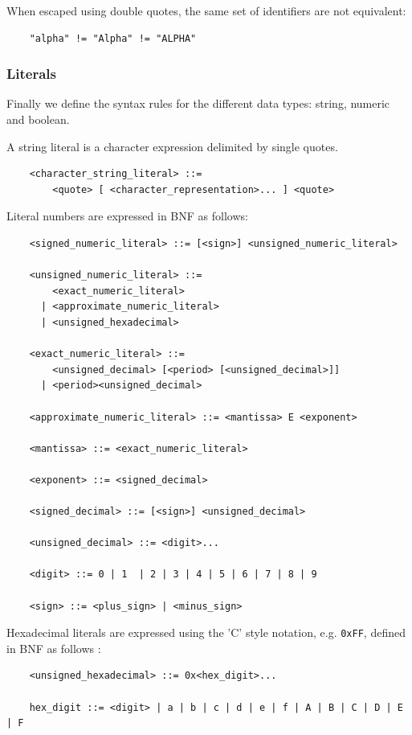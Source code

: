 \documentclass[11pt,a4paper]{ivoa}
\begin{document}
When escaped using double quotes, the same set of identifiers are not equivalent:
\begin{verbatim}
    "alpha" != "Alpha" != "ALPHA"
\end{verbatim}

\subsubsection{Literals}
\label{sec:literals}

Finally we define the syntax rules for the different data types: string,
numeric and boolean.

A string literal is a character expression delimited by single quotes.

\begin{verbatim}
    <character_string_literal> ::=
        <quote> [ <character_representation>... ] <quote>
\end{verbatim}

Literal numbers are expressed in BNF as follows:

\begin{verbatim}
    <signed_numeric_literal> ::= [<sign>] <unsigned_numeric_literal>

    <unsigned_numeric_literal> ::= 
        <exact_numeric_literal>
      | <approximate_numeric_literal>
      | <unsigned_hexadecimal>
              
    <exact_numeric_literal> ::=
        <unsigned_decimal> [<period> [<unsigned_decimal>]]
      | <period><unsigned_decimal>

    <approximate_numeric_literal> ::= <mantissa> E <exponent>

    <mantissa> ::= <exact_numeric_literal>

    <exponent> ::= <signed_decimal>

    <signed_decimal> ::= [<sign>] <unsigned_decimal>

    <unsigned_decimal> ::= <digit>...

    <digit> ::= 0 | 1  | 2 | 3 | 4 | 5 | 6 | 7 | 8 | 9
    
    <sign> ::= <plus_sign> | <minus_sign>
\end{verbatim}

Hexadecimal literals are expressed using the 'C' style notation, e.g. \verb:0xFF:,
defined in BNF as follows :
\begin{verbatim}
    <unsigned_hexadecimal> ::= 0x<hex_digit>...

    hex_digit ::= <digit> | a | b | c | d | e | f | A | B | C | D | E | F
\end{verbatim}
\end{document}
